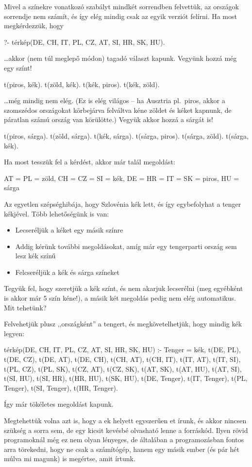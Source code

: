 Mivel a színekre vonatkozó szabályt mindkét
sorrendben felvettük, az országok sorrendje nem
számít, és így elég mindig csak az egyik verziót
felírni. Ha most megkérdezzük, hogy
\begin{query}
?- térkép(DE, CH, IT, PL, CZ, AT, SI, HR, SK, HU).
\end{query}
\dots akkor (nem túl meglepő módon) tagadó választ
kapunk. Vegyünk hozzá még egy színt!
\begin{program}
t(piros, kék). t(zöld, kék).
t(kék, piros). t(kék, zöld).
\end{program}
\dots még mindig nem elég. (Ez is elég világos -- ha
Ausztria pl.~piros, akkor a szomszédos országokat
körbejárva felváltva kéne zöldet és kéket kapnunk,
de páratlan számú ország van körülötte.)
Vegyük akkor hozzá a sárgát is!
\begin{program}
t(piros, sárga). t(zöld, sárga). t(kék, sárga).
t(sárga, piros). t(sárga, zöld). t(sárga, kék).
\end{program}
Ha most tesszük fel a kérdést, akkor már talál
megoldást:
\begin{query}
AT = PL = zöld,
CH = CZ = SI = kék,
DE = HR = IT = SK = piros,
HU = sárga
\end{query}
Az egyetlen szépséghibája, hogy Szlovénia kék lett,
és így egybefolyhat a tenger kékjével. Több
lehetőségünk is van:
\begin{itemize}
\item Lecseréljük a kéket egy másik színre
\item Addig kérünk további megoldásokat, amíg már
  egy tengerparti ország sem lesz kék színű
\item Felcseréljük a kék és sárga színeket
\end{itemize}

Tegyük fel, hogy szeretjük a kék színt, és nem
akarjuk lecserélni (meg egyébként is akkor már 5
szín kéne!), a másik két megoldás pedig nem elég
automatikus. Mit tehetünk?

Felvehetjük plusz ,,országként'' a tengert, és
megkövetelhetjük, hogy mindig kék legyen:
\begin{program}
térkép(DE, CH, IT, PL, CZ, AT, SI, HR, SK, HU) :-
    Tenger = kék,
    t(DE, PL), t(DE, CZ), t(DE, AT), t(DE, CH),
    t(CH, AT), t(CH, IT),
    t(IT, AT), t(IT, SI),
    t(PL, CZ), t(PL, SK),
    t(CZ, AT), t(CZ, SK),
    t(AT, SK), t(AT, HU), t(AT, SI),
    t(SI, HU), t(SI, HR),
    t(HR, HU),
    t(SK, HU),
    t(DE, Tenger), t(IT, Tenger), t(PL, Tenger),
    t(SI, Tenger), t(HR, Tenger).
\end{program}
Így már tökéletes megoldást kapunk.

Megtehettük volna azt is, hogy a ek
helyett egyszerűen et írunk, és akkor
nincsen szükség a  sorra sem, de
egy kicsit kevésbé olvasható lenne a
forráskód. Ilyen rövid programoknál még ez nem olyan
lényeges, de általában a programozásban fontos arra
törekedni, hogy ne csak a számítógép, hanem egy
másik ember (és pár hét múlva mi magunk) is
megértse, amit írtunk.
